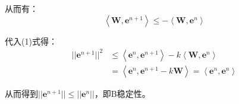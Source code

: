 \documentclass[twoside,a4paper]{article}
\begin{document}
从而有：
\begin{equation*}
    \left\langle \mathbf{W},\mathbf{e}^{n+1} \right\rangle \leq - \left\langle \mathbf{W},\mathbf{e}^{n} \right\rangle
\end{equation*}

代入(1)式得：
\begin{align*}
    ||\mathbf{e}^{n+1}||^2&\leq \left\langle \mathbf{e}^n, \mathbf{e}^{n+1} \right\rangle - k \left\langle \mathbf{W}, \mathbf{e}^{n} \right\rangle\\
    &= \left\langle \mathbf{e}^n, \mathbf{e}^{n+1}-k\mathbf{W} \right\rangle = \left\langle \mathbf{e}^n, \mathbf{e}^{n} \right\rangle
\end{align*}

从而得到$||\mathbf{e}^{n+1}||\leq ||\mathbf{e}^n||$，即B稳定性。



\end{document}
